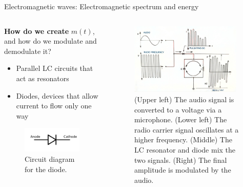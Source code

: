 \documentclass{beamer}
\begin{document}
\begin{frame}{Electromagnetic waves: Electromagnetic spectrum and energy}
\footnotesize
\begin{columns}[T]
\begin{column}{0.35\textwidth}
\textbf{How do we create} $m(t)$, and how do we modulate and demodulate it?
\begin{itemize}
\item Parallel LC circuits that act as resonators
\item Diodes, devices that allow current to flow only one way
\end{itemize}
\begin{figure}
\centering
\includegraphics[width=0.95\textwidth]{figures/diode.png}
\caption{\label{fig:diode} \footnotesize Circuit diagram for the diode.}
\end{figure}
\end{column}
\begin{column}{0.65\textwidth}
\begin{figure}
\centering
\includegraphics[width=0.95\textwidth]{figures/AMSpec3.pdf}
\caption{\label{fig:amspec2} \footnotesize (Upper left) The audio signal is converted to a voltage via a microphone. (Lower left) The radio carrier signal oscillates at a higher frequency. (Middle) The LC resonator and diode mix the two signals. (Right) The final amplitude is modulated by the audio.}
\end{figure}
\end{column}
\end{columns}
\end{frame}
\end{document}
